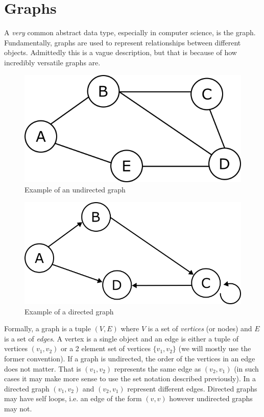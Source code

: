\section{Graphs}
A \textit{very} common abstract data type, especially in computer science, is the graph. Fundamentally, graphs are used to represent relationships between different objects. Admittedly this is a vague description, but that is because of how incredibly versatile graphs are.

\begin{figure}[h]
    \centering
    \includegraphics[scale=0.5]{Images/graph_example.png}
    \caption{Example of an undirected graph}
    \label{fig:undir_graph_eg}
\end{figure}

\begin{figure}[h]
    \centering
    \includegraphics[scale=0.5]{Images/directed_graph_example.png}
    \caption{Example of a directed graph}
    \label{fig:dir_graph_eg}
\end{figure}

Formally, a graph is a tuple $(V, E)$ where $V$ is a set of \textit{vertices} (or nodes) and $E$ is a set of \textit{edges}. A vertex is a single object and an edge is either a tuple of vertices $(v_1, v_2)$ or a 2 element set of vertices $\{v_1, v_2\}$ (we will mostly use the former convention). If a graph is undirected, the order of the vertices in an edge does not matter. That is $(v_1, v_2)$ represents the same edge as $(v_2, v_1)$ (in such cases it may make more sense to use the set notation described previously). In a directed graph $(v_1, v_2)$ and $(v_2, v_1)$ represent different edges. Directed graphs may have self loops, i.e. an edge of the form $(v, v)$ however undirected graphs may not.


